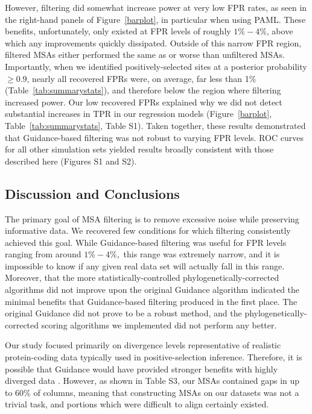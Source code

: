\documentclass[11pt]{article}
\begin{document}
However, filtering did somewhat increase power at very low FPR rates, as seen in the right-hand panels of Figure~\ref{barplot}, in particular when using PAML. These benefits, unfortunately, only existed at FPR levels of roughly $1\% - 4\%$, above which any improvements quickly dissipated. Outside of this narrow FPR region, filtered MSAs either performed the same as or worse than unfiltered MSAs. Importantly, when we identified positively-selected sites at a posterior probability $\geq 0.9$, nearly all recovered FPRs were, on average, far less than 1\% (Table~\ref{tab:summarystats}), and therefore below the region where filtering increased power. Our low recovered FPRs explained why we did not detect substantial increases in TPR in our regression models (Figure~\ref{barplot}, Table~\ref{tab:summarystats}, Table S1). Taken together, these results demonstrated that Guidance-based filtering was not robust to varying FPR levels. ROC curves for all other simulation sets yielded results broadly consistent with those described here (Figures S1 and S2).

\subsection*{Discussion and Conclusions}

The primary goal of MSA filtering is to remove excessive noise while preserving informative data. We recovered few conditions for which filtering consistently achieved this goal. While Guidance-based filtering was useful for FPR levels ranging from around $1\% - 4\%,$ this range was extremely narrow, and it is impossible to know if any given real data set will actually fall in this range. Moreover, that the more statistically-controlled phylogenetically-corrected algorithms did not improve upon the original Guidance algorithm indicated the minimal benefits that Guidance-based filtering produced in the first place. The original Guidance did not prove to be a robust method, and the phylogenetically-corrected scoring algorithms we implemented did not perform any better.

Our study focused primarily on divergence levels representative of realistic protein-coding data typically used in positive-selection inference. Therefore, it is possible that Guidance would have provided stronger benefits with highly diverged data \citep{Jordan2012,Privman2012}. However, as shown in Table S3, our MSAs contained gaps in up to 60\% of columns, meaning that constructing MSAs on our datasets was not a trivial task, and portions which were difficult to align certainly existed.
\end{document}

